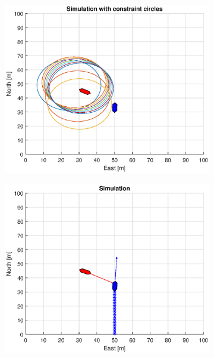 \begin{figure}[!b]
\begin{subfigure}[b]{0.499\textwidth}
    \end{subfigure}
    \hfill
    \\
    \begin{subfigure}[b]{0.49\textwidth}
        \centering
        \includegraphics[width=\textwidth]{Images/Figures/Enkel_SO/Simple0_f1_Frame2}
    \end{subfigure}
    \hfill
    \begin{subfigure}[b]{0.499\textwidth}
        \centering
        \includegraphics[width=\textwidth]{Images/Figures/Enkel_SO/Simple0_f600_Frame2}

\end{subfigure}
\end{figure}
